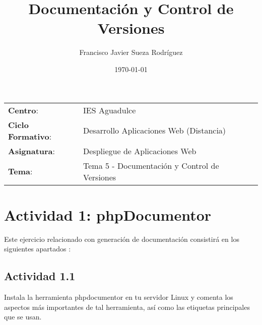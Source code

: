 


\title{
\vspace{10ex}
\normalfont \normalsize
\huge \textbf{Documentación y Control de Versiones}
}
\author{Francisco Javier Sueza Rodríguez}
\date{\normalsize\today}




\maketitle

\thispagestyle{empty}

\vspace{65ex}

\begin{center}
    \begin{tabular}{l l}
        \textbf{Centro}: & IES Aguadulce \\
        \textbf{Ciclo Formativo}: & Desarrollo Aplicaciones Web (Distancia)\\
        \textbf{Asignatura}: & Despliegue de Aplicaciones Web\\
        \textbf{Tema}: & Tema 5 - Documentación y Control de Versiones\\
    \end{tabular}
\end{center}

\newpage

\tableofcontents

\newpage

\listoffigures

\newpage

\section{Actividad 1: phpDocumentor}
Este ejercicio relacionado con generación de documentación consistirá en los siguientes apartados :

\subsection{Actividad 1.1}
Instala la herramienta phpdocumentor en tu servidor Linux y comenta los aspectos más importantes de tal herramienta, así como las etiquetas principales que se usan.

